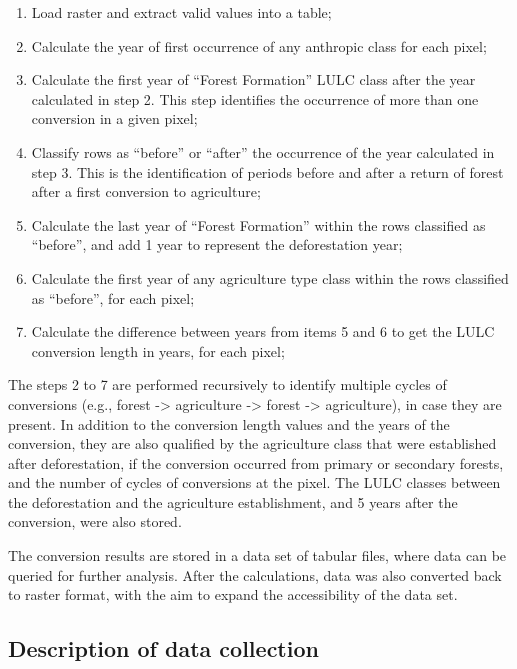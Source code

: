 \documentclass[essd, manuscript]{copernicus}
\begin{document}
\begin{enumerate}
\def\labelenumi{\arabic{enumi}.}
\item
  Load raster and extract valid values into a table;
\item
  Calculate the year of first occurrence of any anthropic class for each pixel;
\item
  Calculate the first year of ``Forest Formation'' LULC class after the year calculated in step 2.
  This step identifies the occurrence of more than one conversion in a given pixel;
\item
  Classify rows as ``before'' or ``after'' the occurrence of the year calculated in step 3.
  This is the identification of periods before and after a return of forest after a first conversion to agriculture;
\item
  Calculate the last year of ``Forest Formation'' within the rows classified as ``before'', and add 1 year to represent the deforestation year;
\item
  Calculate the first year of any agriculture type class within the rows classified as ``before'', for each pixel;
\item
  Calculate the difference between years from items 5 and 6 to get the LULC conversion length in years, for each pixel;
\end{enumerate}

The steps 2 to 7 are performed recursively to identify multiple cycles of conversions (e.g., forest -\textgreater{} agriculture -\textgreater{} forest -\textgreater{} agriculture), in case they are present.
In addition to the conversion length values and the years of the conversion, they are also qualified by the agriculture class that were established after deforestation, if the conversion occurred from primary or secondary forests, and the number of cycles of conversions at the pixel.
The LULC classes between the deforestation and the agriculture establishment, and 5 years after the conversion, were also stored.

The conversion results are stored in a data set of tabular files, where data can be queried for further analysis.
After the calculations, data was also converted back to raster format, with the aim to expand the accessibility of the data set.

\subsection{Description of data collection}
\end{document}
